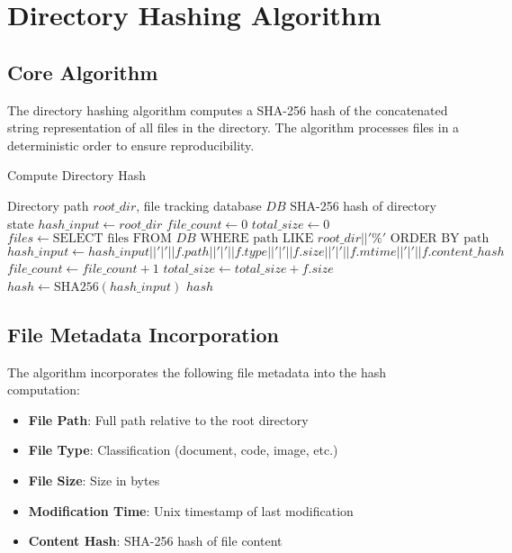 \documentclass[11pt,a4paper]{article}
\begin{document}
\section{Directory Hashing Algorithm}

\subsection{Core Algorithm}

The directory hashing algorithm computes a SHA-256 hash of the concatenated string representation of all files in the directory. The algorithm processes files in a deterministic order to ensure reproducibility.

\begin{algorithm}[H]
\caption{Compute Directory Hash}
\begin{algorithmic}[1]
\REQUIRE Directory path $root\_dir$, file tracking database $DB$
\ENSURE SHA-256 hash of directory state
\STATE $hash\_input \leftarrow root\_dir$
\STATE $file\_count \leftarrow 0$
\STATE $total\_size \leftarrow 0$
\STATE $files \leftarrow \text{SELECT files FROM } DB \text{ WHERE path LIKE } root\_dir || '\text{\%}' \text{ ORDER BY path}$
    \STATE $hash\_input \leftarrow hash\_input || '|' || f.path || '|' || f.type || '|' || f.size || '|' || f.mtime || '|' || f.content\_hash$
    \STATE $file\_count \leftarrow file\_count + 1$
    \STATE $total\_size \leftarrow total\_size + f.size$
\ENDFOR
\STATE $hash \leftarrow \text{SHA256}(hash\_input)$
\RETURN $hash$
\end{algorithmic}
\end{algorithm}

\subsection{File Metadata Incorporation}

The algorithm incorporates the following file metadata into the hash computation:

\begin{itemize}
    \item \textbf{File Path}: Full path relative to the root directory
    \item \textbf{File Type}: Classification (document, code, image, etc.)
    \item \textbf{File Size}: Size in bytes
    \item \textbf{Modification Time}: Unix timestamp of last modification
    \item \textbf{Content Hash}: SHA-256 hash of file content
\end{itemize}
\end{document}
